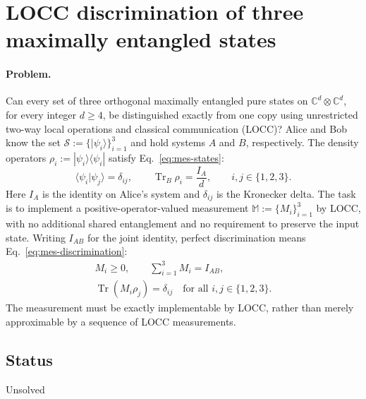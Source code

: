 \section{LOCC discrimination of three maximally entangled states}
\label{sec:op_0c63e4d2400a95b1}

\paragraph{Problem.}
Can every set of three orthogonal maximally entangled pure states on $\mathbb C^d\otimes\mathbb C^d$, for every integer $d\geq4$, be distinguished exactly from one copy using unrestricted two-way local operations and classical communication (LOCC)? Alice and Bob know the set $\mathcal S:=\{|\psi_i\rangle\}_{i=1}^3$ and hold systems $A$ and $B$, respectively. The density operators $\rho_i:=|\psi_i\rangle\langle\psi_i|$ satisfy Eq.~\eqref{eq:mes-states}:
\begin{equation}
\langle\psi_i|\psi_j\rangle=\delta_{ij},
\qquad \operatorname{Tr}_B\rho_i=\frac{I_A}{d},
\qquad i,j\in\{1,2,3\}.
\label{eq:mes-states}
\end{equation}
Here $I_A$ is the identity on Alice's system and $\delta_{ij}$ is the Kronecker delta. The task is to implement a positive-operator-valued measurement $\mathbb M:=\{M_i\}_{i=1}^3$ by LOCC, with no additional shared entanglement and no requirement to preserve the input state. Writing $I_{AB}$ for the joint identity, perfect discrimination means Eq.~\eqref{eq:mes-discrimination}:
\begin{equation}
\begin{gathered}
M_i\geq0,\qquad \sum_{i=1}^3M_i=I_{AB},\\
\operatorname{Tr}(M_i\rho_j)=\delta_{ij}
\quad\text{for all }i,j\in\{1,2,3\}.
\end{gathered}
\label{eq:mes-discrimination}
\end{equation}
The measurement must be exactly implementable by LOCC, rather than merely approximable by a sequence of LOCC measurements.

\subsection*{Status}

Unsolved

